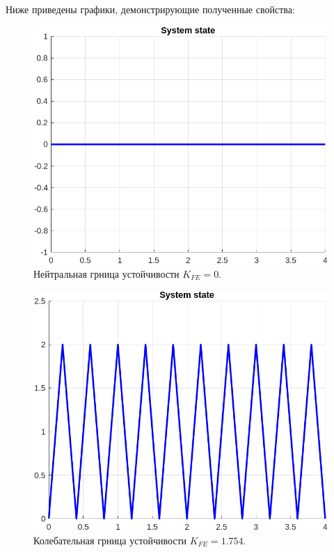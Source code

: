 \documentclass[a4paper, 14pt]{extarticle}
\theoremstyle{definition}
\theoremstyle{plain}
\theoremstyle{remark}
\begin{document}
Ниже приведены графики, демонстрирующие полученные свойства:
\begin{figure}
    [H]
    \centering
    \includegraphics[width=350pt]{images/task1_b__neutral_state.png}
    \caption{Нейтральная грница устойчивости $K_{FE}=0$.}
\end{figure}
\begin{figure}
    [H]
    \centering
    \includegraphics[width=350pt]{images/task1_b__oscill_state.png}
    \caption{Колебательная грница устойчивости $K_{FE}=1.754$.}
\end{figure}
\end{document}
